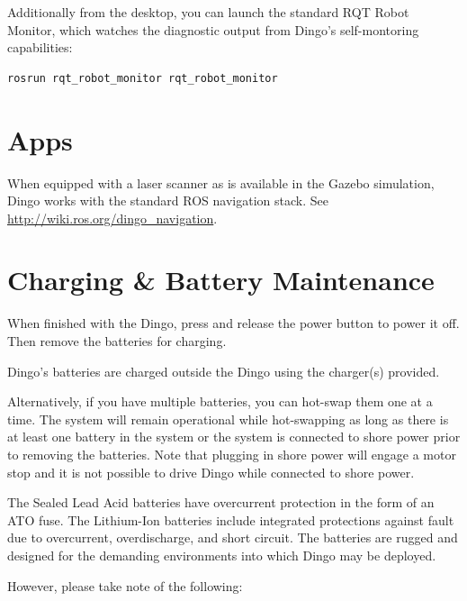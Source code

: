 \documentclass[]{clearpath-latex/clearpath-manual}
\begin{document}
Additionally from the desktop, you can launch the standard RQT Robot Monitor, which
watches the diagnostic output from Dingo's self-montoring capabilities:

\begin{lstlisting}
rosrun rqt_robot_monitor rqt_robot_monitor
\end{lstlisting}

\section{Apps}

When equipped with a laser scanner as is available in the Gazebo simulation, Dingo works with the
standard ROS navigation stack. See \url{http://wiki.ros.org/dingo_navigation}.


\section{Charging \& Battery Maintenance}

When finished with the Dingo, press and release the power button  to power it off. Then remove the batteries for charging.

Dingo's batteries are charged outside the Dingo using the charger(s) provided.

Alternatively, if you have multiple batteries, you can hot-swap them one at a time. The system will remain operational while hot-swapping as long as there is at least one battery in the system or the system is connected to shore power prior to removing the batteries. Note that plugging in shore power will engage a motor stop and it is not possible to drive Dingo while connected to shore power.

The Sealed Lead Acid batteries have overcurrent protection in the form of an ATO fuse. The Lithium-Ion batteries include integrated protections against fault due to overcurrent, overdischarge,
and short circuit. The batteries are rugged and designed for the demanding environments into
which Dingo may be deployed.

However, please take note of the following:
\end{document}
